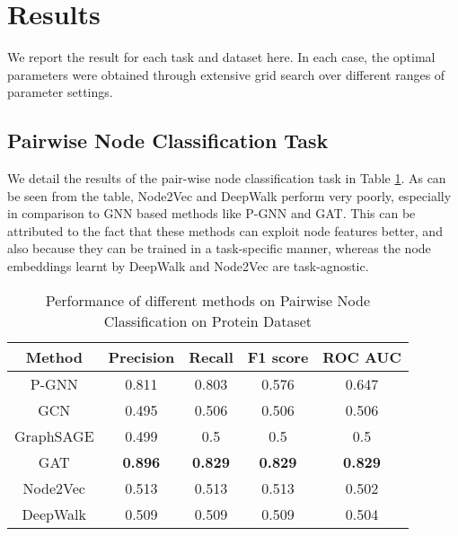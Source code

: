 \documentclass[sigconf]{acmart}
\begin{document}
\section{Results}
We report the result for each task and dataset here. In each case, the optimal parameters were obtained through extensive grid search over different ranges of parameter settings.
\subsection{Pairwise Node Classification Task}
We detail the results of the pair-wise node classification task in Table \ref{tab:pairwise_node_classification}. As can be seen from the table, Node2Vec and DeepWalk perform very poorly, especially in comparison to GNN based methods like P-GNN and GAT. This can be attributed to the fact that these methods can exploit node features better, and also because they can be trained in a task-specific manner, whereas the node embeddings learnt by DeepWalk and Node2Vec are task-agnostic.
\begin{table}[H]
    \centering
    \begin{tabular}{|c|c|c|c|c|}
    \hline
        \textbf{Method} & \textbf{Precision} & \textbf{Recall} & \textbf{F1 score} & \textbf{ROC AUC} \\
        \hline
        P-GNN & 0.811 &	0.803 &	0.576 &	0.647\\
        GCN	&	0.495 & 0.506 & 0.506 & 0.506\\
        GraphSAGE &	0.499 & 0.5 & 0.5 & 0.5\\
        GAT	&	\textbf{0.896} & \textbf{0.829} & \textbf{0.829} & \textbf{0.829} \\
        \hline
         Node2Vec & 0.513 & 0.513 & 0.513 & 0.502\\
         DeepWalk & 0.509 & 0.509 & 0.509 & 0.504\\
         \hline
    \end{tabular}
    \caption{Performance of different methods on Pairwise Node Classification on Protein Dataset}
    \label{tab:pairwise_node_classification}
\end{table}
\end{document}
